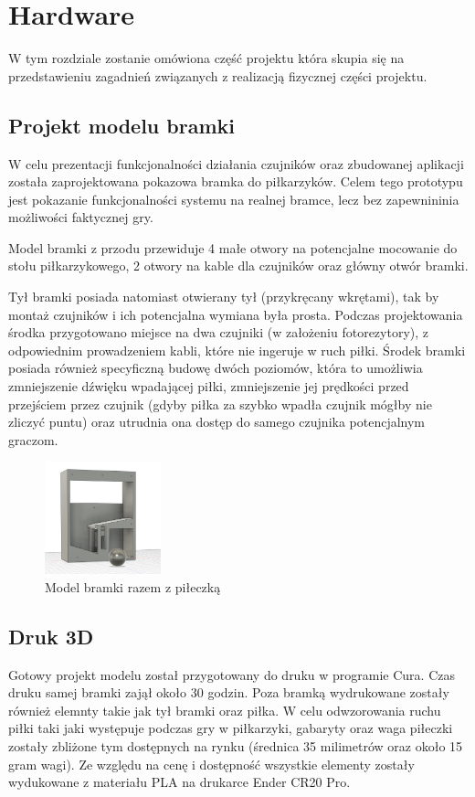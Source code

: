 \chapter{Hardware}
\label{ch:funplenop}
W tym rozdziale zostanie omówiona część projektu która skupia się na przedstawieniu zagadnień związanych z realizacją fizycznej części projektu.

\section{Projekt modelu bramki}
W celu prezentacji funkcjonalności działania czujników oraz zbudowanej aplikacji została zaprojektowana pokazowa bramka do piłkarzyków. Celem tego prototypu jest pokazanie funkcjonalności systemu na realnej bramce, lecz bez zapewnininia możliwości faktycznej gry. 

Model bramki z przodu przewiduje 4 małe otwory na potencjalne mocowanie do stołu piłkarzykowego, 2 otwory na kable dla czujników oraz główny otwór bramki.

Tył bramki posiada natomiast otwierany tył (przykręcany wkrętami), tak by montaż czujników i ich potencjalna wymiana była prosta. Podczas projektowania środka przygotowano miejsce na dwa czujniki (w założeniu fotorezytory), z odpowiednim prowadzeniem kabli, które nie ingeruje w ruch piłki. Środek bramki posiada również specyficzną budowę dwóch poziomów, która to umożliwia zmniejszenie dźwięku wpadającej piłki, zmniejszenie jej prędkości przed przejściem przez czujnik (gdyby piłka za szybko wpadła czujnik mógłby nie zliczyć puntu) oraz utrudnia ona dostęp do samego czujnika potencjalnym graczom.

\begin{figure}[h!]
  \centering
    \includegraphics[width=0.3\textwidth]{images/3D/gate_inside.png}
  \caption{Model bramki razem z piłeczką}
  \label{fig:mobile}
\end{figure}

\section{Druk 3D}
Gotowy projekt modelu został przygotowany do druku w programie Cura. Czas druku samej bramki zajął około 30 godzin. Poza bramką wydrukowane zostały również elemnty takie jak tył bramki oraz piłka. W celu odwzorowania ruchu piłki taki jaki występuje podczas gry w piłkarzyki, gabaryty oraz waga piłeczki zostały zbliżone tym dostępnych na rynku (średnica 35 milimetrów oraz około 15 gram wagi). Ze względu na cenę i dostępność wszystkie elementy zostały wydukowane z materiału PLA na drukarce Ender CR20 Pro.

